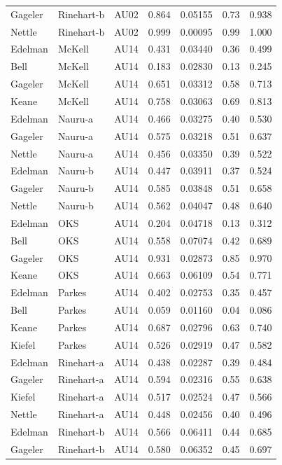 \documentclass{monashthesis}
\begin{document}
\begin{center}
\begin{longtable}{lllllll}
Gageler & Rinehart-b & AU02 & 0.864 & 0.05155 & 0.73 & 0.938 \\
Nettle & Rinehart-b & AU02 & 0.999 & 0.00095 & 0.99 & 1.000 \\
Edelman & McKell & AU14 & 0.431 & 0.03440 & 0.36 & 0.499 \\
Bell & McKell & AU14 & 0.183 & 0.02830 & 0.13 & 0.245 \\
Gageler & McKell & AU14 & 0.651 & 0.03312 & 0.58 & 0.713 \\
Keane & McKell & AU14 & 0.758 & 0.03063 & 0.69 & 0.813 \\
Edelman & Nauru-a & AU14 & 0.466 & 0.03275 & 0.40 & 0.530 \\
Gageler & Nauru-a & AU14 & 0.575 & 0.03218 & 0.51 & 0.637 \\
Nettle & Nauru-a & AU14 & 0.456 & 0.03350 & 0.39 & 0.522 \\
Edelman & Nauru-b & AU14 & 0.447 & 0.03911 & 0.37 & 0.524 \\
Gageler & Nauru-b & AU14 & 0.585 & 0.03848 & 0.51 & 0.658 \\
Nettle & Nauru-b & AU14 & 0.562 & 0.04047 & 0.48 & 0.640 \\
Edelman & OKS & AU14 & 0.204 & 0.04718 & 0.13 & 0.312 \\
Bell & OKS & AU14 & 0.558 & 0.07074 & 0.42 & 0.689 \\
Gageler & OKS & AU14 & 0.931 & 0.02873 & 0.85 & 0.970 \\
Keane & OKS & AU14 & 0.663 & 0.06109 & 0.54 & 0.771 \\
Edelman & Parkes & AU14 & 0.402 & 0.02753 & 0.35 & 0.457 \\
Bell & Parkes & AU14 & 0.059 & 0.01160 & 0.04 & 0.086 \\
Keane & Parkes & AU14 & 0.687 & 0.02796 & 0.63 & 0.740 \\
Kiefel & Parkes & AU14 & 0.526 & 0.02919 & 0.47 & 0.582 \\
Edelman & Rinehart-a & AU14 & 0.438 & 0.02287 & 0.39 & 0.484 \\
Gageler & Rinehart-a & AU14 & 0.594 & 0.02316 & 0.55 & 0.638 \\
Kiefel & Rinehart-a & AU14 & 0.517 & 0.02524 & 0.47 & 0.566 \\
Nettle & Rinehart-a & AU14 & 0.448 & 0.02456 & 0.40 & 0.496 \\
Edelman & Rinehart-b & AU14 & 0.566 & 0.06411 & 0.44 & 0.685 \\
Gageler & Rinehart-b & AU14 & 0.580 & 0.06352 & 0.45 & 0.697 \\

\end{longtable}
\end{center}
\end{document}

